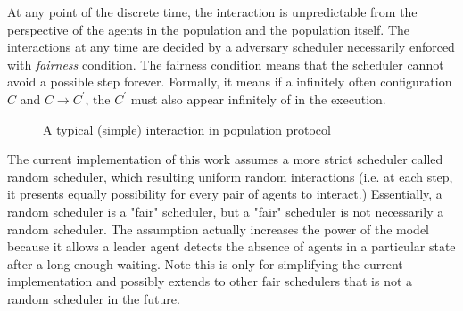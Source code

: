 \par \label{IntroToPPFairScheduler} \noindent
At any point of the discrete time, the interaction is unpredictable from the perspective of the agents
in the population and the population itself. The interactions at any time are decided
by a adversary scheduler necessarily enforced with \textit{fairness} condition.
The fairness condition means that the scheduler cannot avoid a possible step forever.
Formally, it means if a infinitely often configuration $C$ and $C \to C^{'}$,
the $C^{'}$ must also appear infinitely of in the execution.


\begin{figure}[H]
\begin{center}
\end{center}
\caption{A typical (simple) interaction in population protocol}
\end{figure}



\par\noindent
The current implementation of this work assumes a more strict scheduler called random scheduler,
which resulting uniform random interactions (i.e. at each step, it presents
equally possibility for every pair of agents to interact.) Essentially, a random scheduler is a "fair" scheduler, but a "fair" scheduler is not necessarily a random scheduler.
The assumption actually increases the power of the model because it allows a leader agent detects the absence
of agents in a particular state after a long enough waiting. Note this is only for
simplifying the current implementation and possibly extends to other fair schedulers that is not a
random scheduler in the future.

